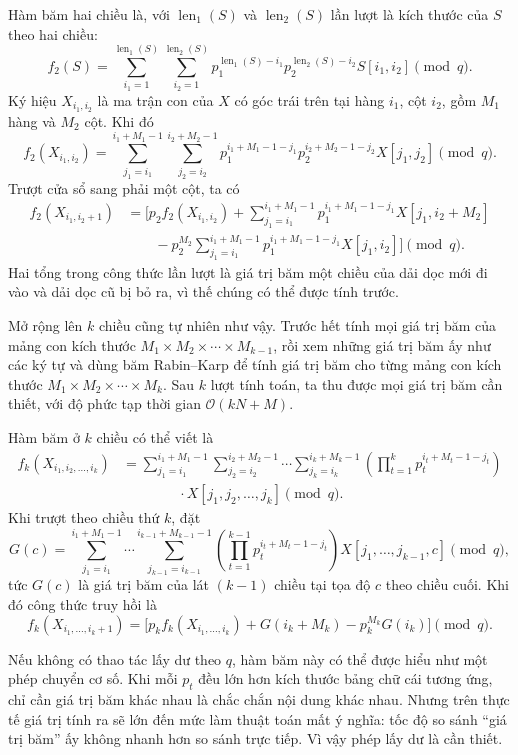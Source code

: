 \documentclass[11pt]{article}
\newcommand{\Oh}{\mathcal{O}}
\begin{document}
Hàm băm hai chiều là, với $\operatorname{len}_1(S)$ và
$\operatorname{len}_2(S)$ lần lượt là kích thước của $S$ theo hai chiều:
\[
  f_2(S)=
  \sum_{i_1=1}^{\operatorname{len}_1(S)}
  \sum_{i_2=1}^{\operatorname{len}_2(S)}
  p_1^{\operatorname{len}_1(S)-i_1}
  p_2^{\operatorname{len}_2(S)-i_2}
  S[i_1,i_2]\pmod q.
\]
Ký hiệu $X_{i_1,i_2}$ là ma trận con của $X$ có góc trái trên tại hàng
$i_1$, cột $i_2$, gồm $M_1$ hàng và $M_2$ cột. Khi đó
\[
  f_2(X_{i_1,i_2})=
  \sum_{j_1=i_1}^{i_1+M_1-1}
  \sum_{j_2=i_2}^{i_2+M_2-1}
  p_1^{i_1+M_1-1-j_1}
  p_2^{i_2+M_2-1-j_2}
  X[j_1,j_2]\pmod q.
\]
Trượt cửa sổ sang phải một cột, ta có
\[
\begin{aligned}
  f_2(X_{i_1,i_2+1})
  &=
  \Biggl[
    p_2 f_2(X_{i_1,i_2})
    + \sum_{j_1=i_1}^{i_1+M_1-1}
      p_1^{i_1+M_1-1-j_1} X[j_1,i_2+M_2] \\
  &\qquad
    -p_2^{M_2}
      \sum_{j_1=i_1}^{i_1+M_1-1}
      p_1^{i_1+M_1-1-j_1} X[j_1,i_2]
  \Biggr]\pmod q.
\end{aligned}
\]
Hai tổng trong công thức lần lượt là giá trị băm một chiều của dải dọc mới
đi vào và dải dọc cũ bị bỏ ra, vì thế chúng có thể được tính trước.

Mở rộng lên $k$ chiều cũng tự nhiên như vậy. Trước hết tính mọi giá trị băm
của mảng con kích thước $M_1\times M_2\times\cdots\times M_{k-1}$, rồi xem
những giá trị băm ấy như các ký tự và dùng băm Rabin--Karp để tính giá trị
băm cho từng mảng con kích thước
$M_1\times M_2\times\cdots\times M_k$. Sau $k$ lượt tính toán, ta thu được
mọi giá trị băm cần thiết, với độ phức tạp thời gian $\Oh(kN+M)$.

Hàm băm ở $k$ chiều có thể viết là
\[
\begin{aligned}
  f_k(X_{i_1,i_2,\ldots,i_k})
  &=
  \sum_{j_1=i_1}^{i_1+M_1-1}
  \sum_{j_2=i_2}^{i_2+M_2-1}
  \cdots
  \sum_{j_k=i_k}^{i_k+M_k-1}
  \left(
    \prod_{t=1}^{k}p_t^{i_t+M_t-1-j_t}
  \right)\\
  &\qquad\qquad\cdot
  X[j_1,j_2,\ldots,j_k]\pmod q.
\end{aligned}
\]
Khi trượt theo chiều thứ $k$, đặt
\[
  G(c)=
  \sum_{j_1=i_1}^{i_1+M_1-1}\cdots
  \sum_{j_{k-1}=i_{k-1}}^{i_{k-1}+M_{k-1}-1}
  \left(\prod_{t=1}^{k-1}p_t^{i_t+M_t-1-j_t}\right)
  X[j_1,\ldots,j_{k-1},c]\pmod q,
\]
tức $G(c)$ là giá trị băm của lát $(k-1)$ chiều tại tọa độ $c$ theo chiều
cuối. Khi đó công thức truy hồi là
\[
  f_k(X_{i_1,\ldots,i_k+1})
  =
  \bigl[
    p_k f_k(X_{i_1,\ldots,i_k})
    +G(i_k+M_k)-p_k^{M_k}G(i_k)
  \bigr]\pmod q.
\]

Nếu không có thao tác lấy dư theo $q$, hàm băm này có thể được hiểu như một
phép chuyển cơ số. Khi mỗi $p_t$ đều lớn hơn kích thước bảng chữ cái tương
ứng, chỉ cần giá trị băm khác nhau là chắc chắn nội dung khác nhau. Nhưng
trên thực tế giá trị tính ra sẽ lớn đến mức làm thuật toán mất ý nghĩa: tốc
độ so sánh ``giá trị băm'' ấy không nhanh hơn so sánh trực tiếp. Vì vậy phép
lấy dư là cần thiết.
\end{document}
